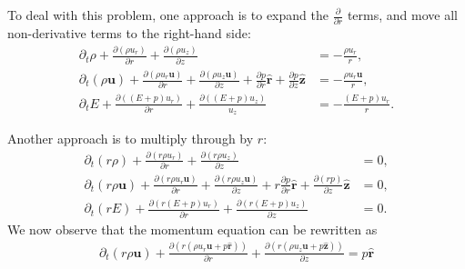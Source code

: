 \documentclass{article}
\begin{document}
To deal with this problem, one approach is to expand the $\frac{\partial}{\partial r}$ terms, and move all non-derivative terms to the right-hand side:
\begin{align}
    \partial_t \rho + \frac{\partial (\rho u_r)}{\partial r} + \frac{\partial (\rho u_z)}{\partial z} &= -\frac{\rho u_r}{r}, \\
    \partial_t (\rho \bm{u}) + \frac{\partial (\rho u_r \bm{u})}{\partial r} + \frac{\partial (\rho u_z \bm{u})}{\partial z} + \frac{\partial p}{\partial r} \hat{\bm{r}} + \frac{\partial p}{\partial z} \hat{\bm{z}} &= -\frac{\rho u_r \bm{u}}{r}, \\
    \partial_t E + \frac{\partial ((E + p) u_r)}{\partial r} + \frac{\partial ((E + p) u_z)}{u_z} &= -\frac{(E + p) u_r}{r}.
\end{align}

Another approach is to multiply through by $r$:
\begin{align}
    \partial_t (r \rho) + \frac{\partial (r \rho u_r)}{\partial r} + \frac{\partial (r \rho u_z)}{\partial z} &= 0, \\
    \partial_t (r \rho \bm{u}) + \frac{\partial (r \rho u_r \bm{u})}{\partial r} + \frac{\partial (r \rho u_z \bm{u})}{\partial z} + r \frac{\partial p}{\partial r} \hat{\bm{r}} + \frac{\partial (r p)}{\partial z}\hat{\bm{z}} &= 0, \\
    \partial_t (r E) + \frac{\partial (r(E+p) u_r)}{\partial r} + \frac{\partial (r(E + p) u_z)}{\partial z} &= 0.
\end{align}
We now observe that the momentum equation can be rewritten as
\begin{align*}
\partial_t (r \rho \bm{u}) + \frac{\partial (r (\rho u_r \bm{u} + p \hat{\bm{r}}))}{\partial r} + \frac{\partial (r(\rho u_z \bm{u} + p \hat{\bm{z}}))}{\partial z} = p \hat{\bm{r}}
\end{align*}
\end{document}
